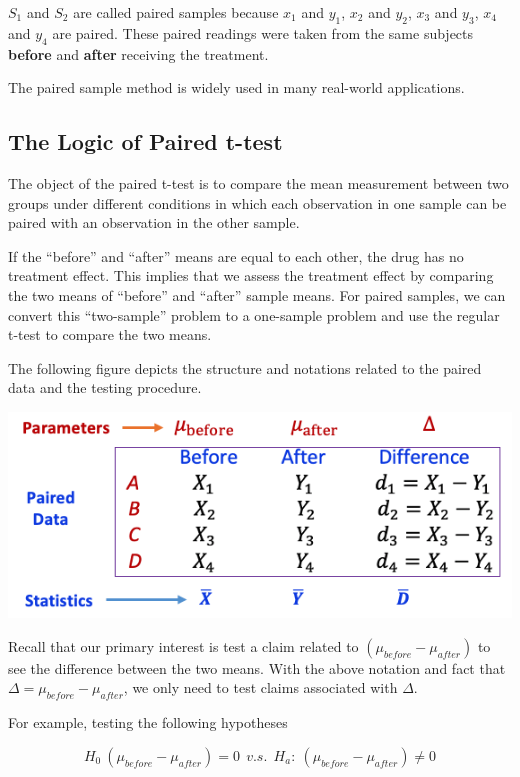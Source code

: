 \documentclass[
]{book}
\begin{document}
\(S_1\) and \(S_2\) are called paired samples because \(x_1\) and \(y_1\), \(x_2\) and \(y_2\), \(x_3\) and \(y_3\), \(x_4\) and \(y_4\) are paired. These paired readings were taken from the same subjects \textbf{before} and \textbf{after} receiving the treatment.

The paired sample method is widely used in many real-world applications.

\hfill\break

\hypertarget{the-logic-of-paired-t-test}{%
\subsection{The Logic of Paired t-test}\label{the-logic-of-paired-t-test}}

The object of the paired t-test is to compare the mean measurement between two groups under different conditions in which each observation in one sample can be paired with an observation in the other sample.

If the ``before'' and ``after'' means are equal to each other, the drug has no treatment effect. This implies that we assess the treatment effect by comparing the two means of ``before'' and ``after'' sample means. For paired samples, we can convert this ``two-sample'' problem to a one-sample problem and use the regular t-test to compare the two means.

The following figure depicts the structure and notations related to the paired data and the testing procedure.

\begin{center}\includegraphics[width=0.5\linewidth]{week10/pairedDataNotation} \end{center}

Recall that our primary interest is test a claim related to \((\mu_{before} - \mu_{after})\) to see the difference between the two means. With the above notation and fact that \(\Delta = \mu_{before} - \mu_{after}\), we only need to test claims associated with \(\Delta\).

For example, testing the following hypotheses

\[
H_0 \ (\mu_{before} - \mu_{after}) = 0 \  \  v.s. \ \ H_a: \ (\mu_{before} - \mu_{after}) \ne 0
\]
\end{document}

